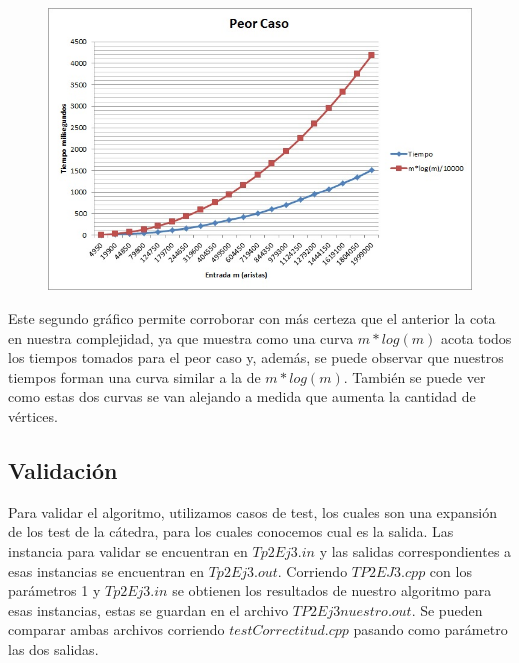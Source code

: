 \begin{figure}[H]
  \begin{center}
      \includegraphics[scale=0.70]{../PeorCasoEj3.jpg}
  \end{center}
 \end{figure}

Este segundo gráfico permite corroborar con más certeza que el anterior la cota en nuestra complejidad, ya que muestra como una curva $m*log(m)$ acota todos los tiempos tomados para el peor caso y, además, se puede observar que nuestros tiempos forman una curva similar a la de $m*log(m)$. También se puede ver como estas dos curvas se van alejando a medida que aumenta la cantidad de vértices.

\subsection{Validación}

Para validar el algoritmo, utilizamos casos de test, los cuales son una expansión de los test de la cátedra, para los cuales conocemos cual es la salida. Las instancia para validar se encuentran en $Tp2Ej3.in$ y las salidas correspondientes a esas instancias se encuentran en $Tp2Ej3.out$. Corriendo $TP2EJ3.cpp$ con los parámetros 1 y $Tp2Ej3.in$ se obtienen los resultados de nuestro algoritmo para esas instancias, estas se guardan en el archivo $TP2Ej3nuestro.out$. Se pueden comparar ambas archivos corriendo $testCorrectitud.cpp$ pasando como parámetro las dos salidas.
